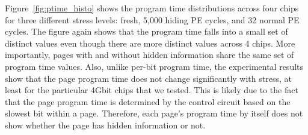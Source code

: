 


Figure~\ref{fig:ptime_histo} shows the program time distributions across
four chips for three different stress levels: fresh, 5,000 hiding PE cycles,
and 32 normal PE cycles. The figure again shows that the program time falls
into a small set of distinct values even though there are more distinct values 
across 4 chips. More importantly, pages with and without hidden information share 
the same set of program time values. 
Also, unlike per-bit program time, the experimental results show that 
the page program time does not change significantly with stress, at least
for the particular 4Gbit chips that we tested.
This is likely due to the fact that the page program time is determined by the
control circuit based on the slowest bit within a page.
Therefore, each page's program time by itself does not show whether the page has
hidden information or not. 





